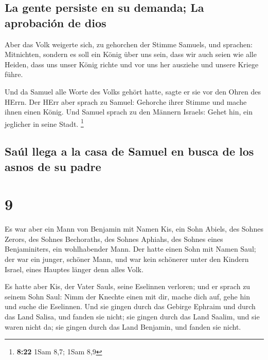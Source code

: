 \hypertarget{la-gente-persiste-en-su-demanda-la-aprobaciuxf3n-de-dios}{%
\subsection{La gente persiste en su demanda; La aprobación de
dios}\label{la-gente-persiste-en-su-demanda-la-aprobaciuxf3n-de-dios}}

 Aber das Volk weigerte sich, zu gehorchen der Stimme
Samuels, und sprachen: Mitnichten, sondern es soll ein König über uns
sein,  dass wir auch seien wie alle Heiden, dass uns
unser König richte und vor uns her ausziehe und unsere Kriege führe.

 Und da Samuel alle Worte des Volks gehört hatte, sagte
er sie vor den Ohren des HErrn.  Der HErr aber sprach zu
Samuel: Gehorche ihrer Stimme und mache ihnen einen König. Und Samuel
sprach zu den Männern Israels: Gehet hin, ein jeglicher in seine Stadt.
\footnote{\textbf{8:22} 1Sam 8,7; 1Sam 8,9}

\hypertarget{sauxfal-llega-a-la-casa-de-samuel-en-busca-de-los-asnos-de-su-padre}{%
\subsection{Saúl llega a la casa de Samuel en busca de los asnos de su
padre}\label{sauxfal-llega-a-la-casa-de-samuel-en-busca-de-los-asnos-de-su-padre}}

\hypertarget{section-8}{%
\section{9}\label{section-8}}

 Es war aber ein Mann von Benjamin mit Namen Kis, ein Sohn
Abiels, des Sohnes Zerors, des Sohnes Bechoraths, des Sohnes Aphiahs,
des Sohnes eines Benjaminiters, ein wohlhabender Mann. 
Der hatte einen Sohn mit Namen Saul; der war ein junger, schöner Mann,
und war kein schönerer unter den Kindern Israel, eines Hauptes länger
denn alles Volk.

 Es hatte aber Kis, der Vater Sauls, seine Eselinnen
verloren; und er sprach zu seinem Sohn Saul: Nimm der Knechte einen mit
dir, mache dich auf, gehe hin und suche die Eselinnen. 
Und sie gingen durch das Gebirge Ephraim und durch das Land Salisa, und
fanden sie nicht; sie gingen durch das Land Saalim, und sie waren nicht
da; sie gingen durch das Land Benjamin, und fanden sie nicht.

